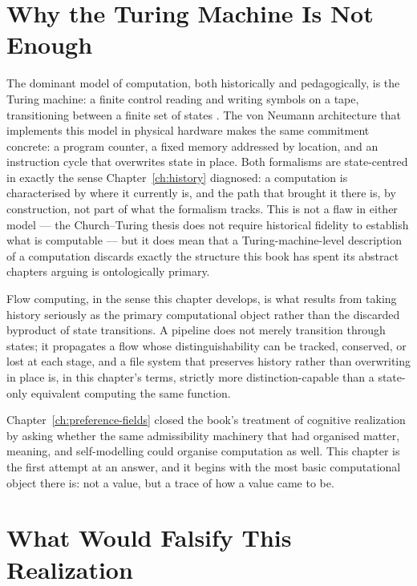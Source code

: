 \documentclass[12pt,twoside,openright]{book}
\begin{document}
\section{Why the Turing Machine Is Not Enough}
\label{sec:ch23-why-turing}

The dominant model of computation, both historically and
pedagogically, is the Turing machine: a finite control
reading and writing symbols on a tape, transitioning between
a finite set of states \parencite{turing1936}. The von Neumann
architecture that implements this model in physical hardware
makes the same commitment concrete: a program counter,
a fixed memory addressed by location, and an instruction
cycle that overwrites state in place. Both formalisms are
state-centred in exactly the sense Chapter~\ref{ch:history}
diagnosed: a computation is characterised by where it
currently is, and the path that brought it there is, by
construction, not part of what the formalism tracks. This is
not a flaw in either model --- the Church--Turing thesis does
not require historical fidelity to establish what is
computable --- but it does mean that a Turing-machine-level
description of a computation discards exactly the structure
this book has spent its abstract chapters arguing is
ontologically primary.

Flow computing, in the sense this chapter develops, is what
results from taking history seriously as the primary
computational object rather than the discarded byproduct of
state transitions. A pipeline does not merely transition
through states; it propagates a flow whose distinguishability
can be tracked, conserved, or lost at each stage, and a file
system that preserves history rather than overwriting in
place is, in this chapter's terms, strictly more
distinction-capable than a state-only equivalent computing
the same function.

Chapter~\ref{ch:preference-fields} closed the book's treatment
of cognitive realization by asking whether the same
admissibility machinery that had organised matter, meaning,
and self-modelling could organise computation as well. This
chapter is the first attempt at an answer, and it begins with
the most basic computational object there is: not a value, but
a trace of how a value came to be.

\section{What Would Falsify This Realization}
\label{sec:ch23-falsifiability}
\end{document}
